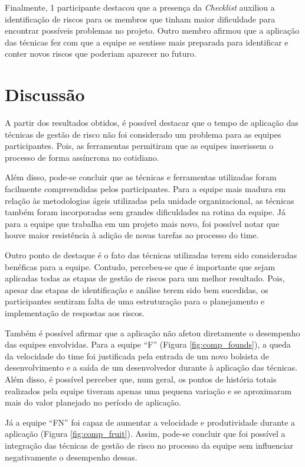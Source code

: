 \documentclass[
    12pt,       %
    openright,      %
    twoside,      %
    a4paper,      %
    english,      %
    french,       %
    spanish,      %
    brazil,       %
    ]{abntex2}
\begin{document}
Finalmente, 1 participante destacou que a presença da \textit{Checklist} auxiliou a identificação de riscos para os membros que tinham maior dificuldade para encontrar possíveis problemas no projeto. Outro membro afirmou que a aplicação das técnicas fez com que a equipe se sentisse mais preparada para identificar e conter novos riscos que poderiam aparecer no futuro.\\


\section{Discussão}

A partir dos resultados obtidos, é possível destacar que o tempo de aplicação das técnicas de gestão de risco não foi considerado um problema para as equipes participantes. Pois, as ferramentas permitiram que as equipes inserissem o processo de forma assíncrona no cotidiano.

Além disso, pode-se concluir que as técnicas e ferramentas utilizadas foram facilmente compreendidas pelos participantes. Para a equipe mais madura em relação às metodologias ágeis utilizadas pela unidade organizacional, as técnicas também foram incorporadas sem grandes dificuldades na rotina da equipe. Já para a equipe que trabalha em um projeto mais novo, foi possível notar que houve maior resistência à adição de novas tarefas ao processo do time.

Outro ponto de destaque é o fato das técnicas utilizadas terem sido consideradas benéficas para a equipe. Contudo, percebeu-se que é importante que sejam aplicadas todas as etapas de gestão de riscos para um melhor resultado. Pois, apesar das etapas de identificação e análise terem sido bem sucedidas, os participantes sentiram falta de uma estruturação para o planejamento e implementação de respostas aos riscos. 

Também é possível afirmar que a aplicação não afetou diretamente o desempenho das equipes envolvidas. Para a equipe ``F'' (Figura \ref{fig:comp_founds}), a queda da velocidade do time foi justificada pela entrada de um novo bolsista de desenvolvimento e a saída de um desenvolvedor durante à aplicação das técnicas. Além disso, é possível perceber que, num geral, os pontos de história totais realizados pela equipe tiveram apenas uma pequena variação e se aproximaram mais do valor planejado no período de aplicação.

Já a equipe ``FN'' foi capaz de aumentar a velocidade e produtividade durante a aplicação (Figura \ref{fig:comp_fruit}). Assim, pode-se concluir que foi possível a integração das técnicas de gestão de risco no processo da equipe sem influenciar negativamente o desempenho dessas.
\end{document}
